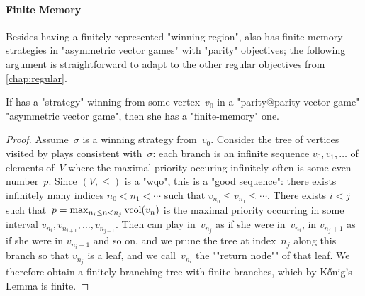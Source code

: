 \paragraph{Finite Memory} 
Besides having a finitely represented "winning region", \Eve also has
finite memory strategies in "asymmetric vector games" with "parity"
objectives; the following argument is straightforward to adapt to
the other regular objectives from \cref{chap:regular}.
\begin{lemma}\label{12-fact-finmem}
  If \Eve has a "strategy" winning from some vertex~$v_0$ in a
  "parity@parity vector game" "asymmetric vector game", then she has a
  "finite-memory" one.
\end{lemma}
\begin{proof}
  Assume~$\sigma$ is a winning strategy from~$v_0$.  Consider the tree
  of vertices visited by plays consistent with~$\sigma$: each branch
  is an infinite sequence $v_0,v_1,\dots$ of elements of~$V$ where the
  maximal priority occuring infinitely often is some even number~$p$.
  Since $(V,{\leq})$ is a "wqo", this is a "good sequence": there
  exists infinitely many indices $n_0<n_1<\cdots$ such that
  $v_{n_0}\leq v_{n_1}\leq\cdots$.  There exists $i<j$ such
  that~$p=\max_{n_i\leq n<n_j}\mathrm{vcol}(v_n)$ is the maximal priority
  occurring in some interval $v_{n_i},v_{n_{i+1}},\dots,v_{n_{j-1}}$.
  Then \Eve can play in~$v_{n_j}$ as if she were in~$v_{n_i}$, in
  $v_{n_j+1}$ as if she were in $v_{n_i+1}$ and so on, and we prune
  the tree at index~$n_j$ along this branch so that $v_{n_j}$ is a
  leaf, and we call~$v_{n_i}$ the ""return node"" of that leaf.  We
  therefore obtain a finitely branching tree with finite branches,
  which by K\H{o}nig's Lemma is finite.


\end{proof}
